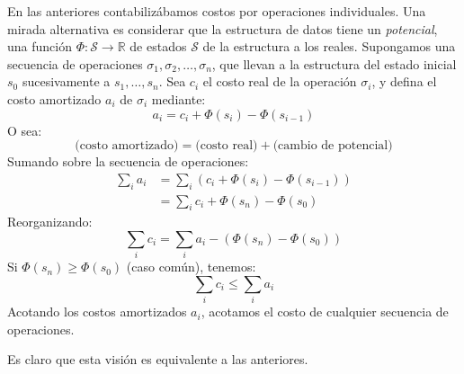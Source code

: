   En las anteriores contabilizábamos costos por operaciones individuales.
  Una mirada alternativa es considerar que la estructura de datos
  tiene un \emph{potencial},
  una función \(\Phi \colon \mathscr{S} \to \mathbb{R}\)
  de estados \(\mathscr{S}\) de la estructura a los reales.
  Supongamos una secuencia de operaciones
  \(\sigma_1, \sigma_2, \dotsc, \sigma_n\),
  que llevan a la estructura del estado inicial \(s_0\)
  sucesivamente a \(s_1, \dotsc, s_n\).
  Sea \(c_i\) el costo real de la operación \(\sigma_i\),
  y defina el costo amortizado \(a_i\) de \(\sigma_i\) mediante:
  \begin{equation*}
    a_i
      = c_i + \Phi(s_i) - \Phi(s_{i - 1})
  \end{equation*}
  O sea:
  \begin{equation*}
    \text{(costo amortizado)}
      = \text{(costo real)}
          + \text{(cambio de potencial)}
  \end{equation*}
  Sumando sobre la secuencia de operaciones:
  \begin{align*}
    \sum_i a_i
      &= \sum_i (c_i + \Phi(s_i) - \Phi(s_{i - 1})) \\
      &= \sum_i c_i + \Phi(s_n) - \Phi(s_0)
  \end{align*}
  Reorganizando:
  \begin{equation*}
    \sum_i c_i
      = \sum_i a_i - (\Phi(s_n) - \Phi(s_0))
  \end{equation*}
  Si \(\Phi(s_n) \ge \Phi(s_0)\)
  (caso común),
  tenemos:
  \begin{equation*}
    \sum_i c_i
      \le \sum_i a_i
  \end{equation*}
  Acotando los costos amortizados \(a_i\),
  acotamos el costo de cualquier secuencia de operaciones.

  Es claro que esta visión es equivalente a las anteriores.

